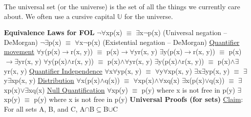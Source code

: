 \documentclass{article}
\begin{document}
\begin{tiny}
The universal set (or the universe) is the set of all the things we currently care about. We often use a cursive capital $\mathbb{U}$ for the universe.\newline\newline





\textbf{Equivalence Laws for FOL}\newline
$\neg$$\forall$xp(x) $\equiv$ $\exists$x$\neg$p(x) (Universal negation -- DeMorgan)\newline
$\neg$$\exists$p(x) $\equiv$ $\forall$x$\neg$p(x) (Existential negation -- DeMorgan)\newline\newline
\underline{Quantifier movement}\newline
$\forall$y(p(x)$\rightarrow$r(x, y)) $\equiv$ p(x)$\rightarrow$$\forall$yr(x, y)\newline
$\exists$y(p(x)$\rightarrow$r(x, y)) $\equiv$ p(x)$\rightarrow$$\exists$yr(x, y)\newline
$\forall$y(p(x)$\wedge$r(x, y)) $\equiv$ p(x)$\wedge$$\forall$yr(x, y)\newline
$\exists$y(p(x)$\wedge$r(x, y)) $\equiv$ p(x)$\wedge$$\exists$yr(x, y)\newline\newline
\underline{Quantifier Independence}\newline
$\forall$x$\forall$yp(x, y) $\equiv$ $\forall$y$\forall$xp(x, y)\newline
$\exists$x$\exists$yp(x, y) $\equiv$ $\exists$y$\exists$xp(x, y)\newline\newline
\underline{Distribution}\newline
$\forall$x(p(x)$\wedge$q(x)) $\equiv$ $\forall$xp(x)$\wedge$$\forall$xq(x)\newline
$\exists$x(p(x)$\lor$q(x)) $\equiv$ $\exists$xp(x)$\lor$$\exists$xq(x)\newline\newline
\underline{Null Quantification}\newline
$\forall$xp(y) $\equiv$ p(y) where x is not free in p(y)\newline
$\exists$xp(y) $\equiv$ p(y) where x is not free in p(y)\newline\newline
\textbf{Universal Proofs (for sets)}\newline
\underline{Claim}: For all sets A, B, and C, A$\cap$B$\subseteq$B$\cup$C\newline

\end{tiny}
\end{document}

